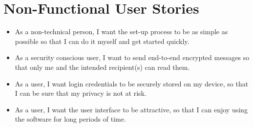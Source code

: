 \section{Non-Functional User Stories}
\begin{itemize}
  \item As a non-technical person, I want the set-up process to be as simple as possible so that I can do it myself and get started quickly.
  \item As a security conscious user, I want to send end-to-end encrypted messages so that only me and the intended recipient(s) can read them.
  \item As a user, I want login credentials to be securely stored on my device, so that I can be sure that my privacy is not at risk.
  \item As a user, I want the user interface to be attractive, so that I can enjoy using the software for long periods of time.
\end{itemize}